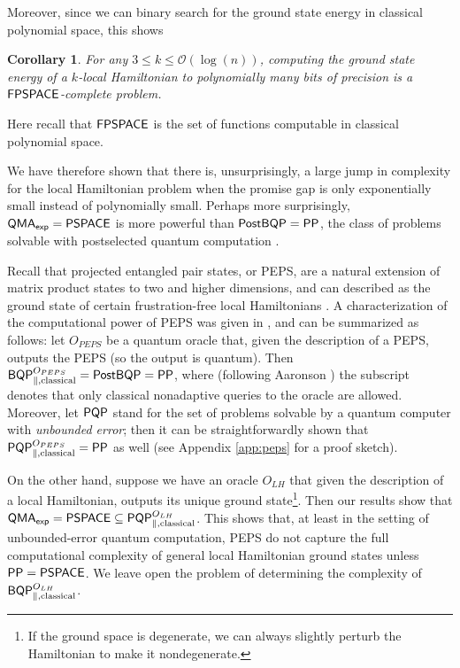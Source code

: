 \documentclass[11pt]{article}
\newtheorem{corollary}[theorem]{Corollary}
\theoremstyle{definition}
\theoremstyle{remark}
\newcommand\PSPACE{{\sf{PSPACE}}}
\newcommand\FPSPACE{{\sf{FPSPACE}}}
\newcommand\PP{\sf{PP}}
\newcommand\BQP{{\sf{BQP}}}
\newcommand\PostBQP{{\sf{PostBQP}}}
\newcommand\PQP{{\sf{PQP}}}
\newcommand\QMAexp{{\sf{QMA}_{exp}}}
\begin{document}
Moreover, since we can binary search for the ground state energy in classical polynomial space, this shows
\begin{corollary}
For any $3 \le k \le \mathcal{O}(\log(n))$, computing the ground state energy of a $k$-local Hamiltonian to polynomially many bits of precision is a $\FPSPACE$-complete problem.
\end{corollary}
Here recall that $\FPSPACE$ is the set of functions computable in classical polynomial space.

We have therefore shown that there is, unsurprisingly, a large jump in complexity for the local Hamiltonian problem when the promise gap is only exponentially small instead of polynomially small. Perhaps more surprisingly, $\QMAexp = \PSPACE$ is more powerful than $\PostBQP=\PP$, the class of problems solvable with postselected quantum computation \cite{aaronson05}.

Recall that projected entangled pair states, or PEPS, are a natural extension of matrix product states to two and higher dimensions, and can described as the ground state of certain frustration-free local Hamiltonians \cite{vc04}. A characterization of the computational power of PEPS was given in \cite{swv07}, and can be summarized as follows: let $O_{PEPS}$ be a quantum oracle that, given the description of a PEPS, outputs the PEPS (so the output is quantum). Then $\BQP^{O_{PEPS}}_{\parallel,\text{classical}} = \PostBQP = \PP$, where (following Aaronson \cite{aaronson05}) the subscript  denotes that only classical nonadaptive queries to the oracle are allowed. Moreover, let $\PQP$ stand for the set of problems solvable by a quantum computer with \emph{unbounded error}; then it can be straightforwardly shown that $\PQP^{O_{PEPS}}_{\parallel,\text{classical}} = \PP$ as well (see Appendix \ref{app:peps} for a proof sketch).

On the other hand, suppose we have an oracle $O_{LH}$ that given the description of a local Hamiltonian, outputs its unique ground state\footnote{If the ground space is degenerate, we can always slightly perturb the Hamiltonian to make it nondegenerate.}. Then our results show that $\QMAexp = \PSPACE \subseteq \PQP^{O_{LH}}_{\parallel,\text{classical}}$. This shows that, at least in the setting of unbounded-error quantum computation, PEPS do not capture the full computational complexity of general local Hamiltonian ground states unless $\PP=\PSPACE$. We leave open the problem of determining the complexity of $\BQP^{O_{LH}}_{\parallel,\text{classical}}$.
\end{document}
